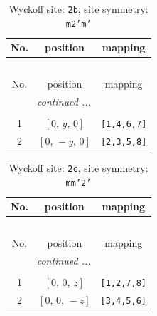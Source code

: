 \documentclass[fleqn,8pt]{jsarticle}
\begin{document}
\begin{longtable}{ccc}
\caption{Wyckoff site: {\tt 2b}, site symmetry: {\tt m2'm'}}
 \\
 \hline \hline
No. & position & mapping \\ \hline \endfirsthead

\multicolumn{2}{l}{\tablename\ \thetable{}} \\
 \hline \hline
No. & position & mapping \\ \hline \endhead

 \hline \hline
\multicolumn{2}{r}{\footnotesize\it continued ...} \\ \endfoot

 \hline \hline
\multicolumn{2}{r}{} \\ \endlastfoot

1 & $\left[ 0,\, y,\, 0 \right]$ & {\tt [1,4,6,7]} \\ \hline
2 & $\left[ 0,\, - y,\, 0 \right]$ & {\tt [2,3,5,8]} \\
\end{longtable}
\renewcommand{\arraystretch}{1.2}
\begin{longtable}{ccc}
\caption{Wyckoff site: {\tt 2c}, site symmetry: {\tt mm'2'}}
 \\
 \hline \hline
No. & position & mapping \\ \hline \endfirsthead

\multicolumn{2}{l}{\tablename\ \thetable{}} \\
 \hline \hline
No. & position & mapping \\ \hline \endhead

 \hline \hline
\multicolumn{2}{r}{\footnotesize\it continued ...} \\ \endfoot

 \hline \hline
\multicolumn{2}{r}{} \\ \endlastfoot

1 & $\left[ 0,\, 0,\, z \right]$ & {\tt [1,2,7,8]} \\ \hline
2 & $\left[ 0,\, 0,\, - z \right]$ & {\tt [3,4,5,6]} \\
\end{longtable}
\renewcommand{\arraystretch}{1.2}
\end{document}
